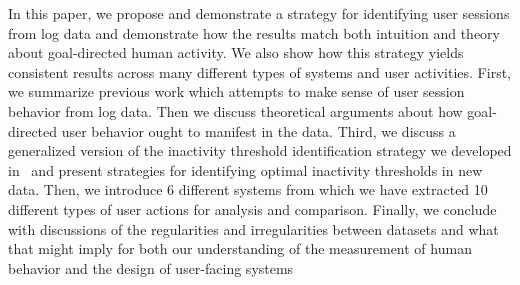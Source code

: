 In this paper, we propose and demonstrate a strategy for identifying user sessions from log data and demonstrate how the results match both intuition and theory about goal-directed human activity.  We also show how this strategy yields consistent results across many different types of systems and user activities.  First, we summarize previous work which attempts to make sense of user session behavior from log data.  Then we discuss theoretical arguments about how goal-directed user behavior ought to manifest in the data.  Third, we discuss a generalized version of the inactivity threshold identification strategy we developed in~\cite{geiger2013using} and present strategies for identifying optimal inactivity thresholds in new data.  Then, we introduce 6 different systems from which we have extracted 10 different types of user actions for analysis and comparison. Finally, we conclude with discussions of the regularities and irregularities between datasets and what that might imply for both our understanding of the measurement of human behavior and the design of user-facing systems
